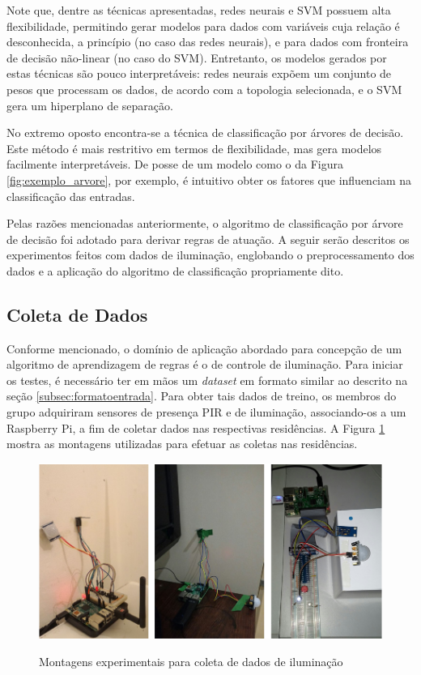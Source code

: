 Note que, dentre as técnicas apresentadas, redes neurais e SVM possuem alta flexibilidade, permitindo gerar modelos para dados com variáveis cuja relação é desconhecida, a princípio (no caso das redes neurais), e para dados com fronteira de decisão não-linear (no caso do SVM). Entretanto, os modelos gerados por estas técnicas são pouco interpretáveis: redes neurais expõem um conjunto de pesos que processam os dados, de acordo com a topologia selecionada, e o SVM gera um hiperplano de separação.

No extremo oposto encontra-se a técnica de classificação por árvores de decisão. Este método é mais restritivo em termos de flexibilidade, mas gera modelos facilmente interpretáveis. De posse de um modelo como o da Figura \ref{fig:exemplo_arvore}, por exemplo, é intuitivo obter os fatores que influenciam na classificação das entradas.

Pelas razões mencionadas anteriormente, o algoritmo de classificação por árvore de decisão foi adotado para derivar regras de atuação. A seguir serão descritos os experimentos feitos com  dados de iluminação, englobando o preprocessamento dos dados e a aplicação do algoritmo de classificação propriamente dito.


\subsection{Coleta de Dados}
Conforme mencionado, o domínio de aplicação abordado para concepção de um algoritmo de aprendizagem de regras é o de controle de iluminação. Para iniciar os testes, é necessário ter em mãos um \textit{dataset} em formato similar ao descrito na seção \ref{subsec:formatoentrada}. Para obter tais dados de treino, os membros do grupo adquiriram sensores de presença PIR e de iluminação, associando-os a um Raspberry Pi, a fim de coletar dados nas respectivas residências. A Figura \ref{fig:montagem_coleta} mostra as montagens utilizadas para efetuar as coletas nas residências.

\begin{figure}[h]
	\centering
	\caption{Montagens experimentais para coleta de dados de iluminação}
	\smallskip
  \includegraphics[width=\textwidth]{imagens/montagem_coleta.png}
  \label{fig:montagem_coleta}  
\end{figure}

